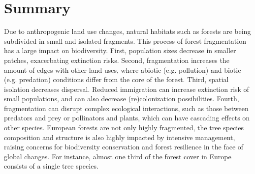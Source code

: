 \documentclass[10pt, twoside]{book} %
\makeatletter
\def\mainmatter{%
	\cleardoublepage
	\@mainmattertrue
	\pagenumbering{arabic}
	\def\mainmatter{\cleardoublepage\@mainmattertrue}
}
\makeatother
\begin{document}
%		
		
	
	\newpage{\thispagestyle{empty}\cleardoublepage}
	{\tableofcontents}
	

	\clearpage
	\thispagestyle{empty} %



	\mainmatter
\cleardoublepage
\thispagestyle{plain} %
\chapter*{Summary}

Due to anthropogenic land use changes, natural habitats such as forests are being subdivided in small and isolated fragments. This process of forest fragmentation has a large impact on biodiversity. First, population sizes decrease in smaller patches, exacerbating extinction risks. Second, fragmentation increases the amount of edges with other land uses, where abiotic (e.g. pollution) and biotic (e.g. predation) conditions differ from the core of the forest. Third, spatial isolation decreases dispersal. Reduced immigration can increase extinction risk of small populations, and can also decrease (re)colonization possibilities. Fourth, fragmentation can disrupt complex ecological interactions, such as those between predators and prey or pollinators and plants, which can have cascading effects on other species. European forests are not only highly fragmented, the tree species composition and structure is also highly impacted by intensive management, raising concerns for biodiversity conservation and forest resilience in the face of global changes. For instance, almost one third of the forest cover in Europe consists of a single tree species.\\
\end{document}
